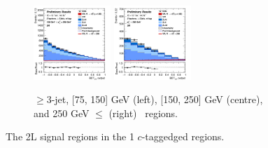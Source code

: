 \begin{figure}[h!]
\begin{subfigure}[b]{\textwidth}
        \includegraphics[width=0.32\textwidth]{Images/VH/Own_fit/postfit_VHcc/Region_distmva_BMax250_BMin150_DSR_J3_TTypent_incJet1_T1_L2_Y6051_GlobalFit_conditionnal_mu1.png}
        \includegraphics[width=0.32\textwidth]{Images/VH/Own_fit/postfit_VHcc/Region_distmva_BMin250_DSR_J3_TTypent_incJet1_T1_L2_Y6051_GlobalFit_conditionnal_mu1.png}
        \caption{$\geq$3-jet, [75, 150] GeV (left), [150, 250] GeV (centre), and 250  GeV $\leq$ (right) \ptv\ regions.}
        \label{fig:plots_VHcc_2L_SR_1c_3J}
    \end{subfigure}
    \caption{The 2L signal regions in the 1 $c$-taggedged regions.}
    \label{fig:plots_VHcc_2L_SR_1c}
\end{figure}

\newpage
\vspace*{\fill} 


